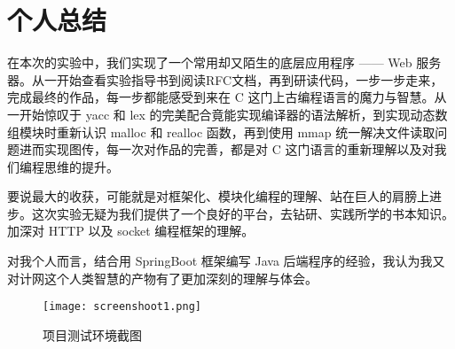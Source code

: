\chapter{个人总结}

在本次的实验中，我们实现了一个常用却又陌生的底层应用程序 —— Web 服务器。从一开始查看实验指导书到阅读RFC文档，再到研读代码，一步一步走来，完成最终的作品，每一步都能感受到来在 C 这门上古编程语言的魔力与智慧。从一开始惊叹于 yacc 和 lex 的完美配合竟能实现编译器的语法解析，到实现动态数组模块时重新认识 malloc 和 realloc 函数，再到使用 mmap 统一解决文件读取问题进而实现图传，每一次对作品的完善，都是对 C 这门语言的重新理解以及对我们编程思维的提升。

要说最大的收获，可能就是对框架化、模块化编程的理解、站在巨人的肩膀上进步。这次实验无疑为我们提供了一个良好的平台，去钻研、实践所学的书本知识。加深对 HTTP 以及 socket 编程框架的理解。

对我个人而言，结合用 SpringBoot 框架编写 Java 后端程序的经验，我认为我又对计网这个人类智慧的产物有了更加深刻的理解与体会。

\begin{figure}[htbp!]
    \begin{center}
        \texttt{[image: screenshoot1.png]}
        \caption{项目测试环境截图}\label{fig:screenshoot1}
    \end{center}
\end{figure}
